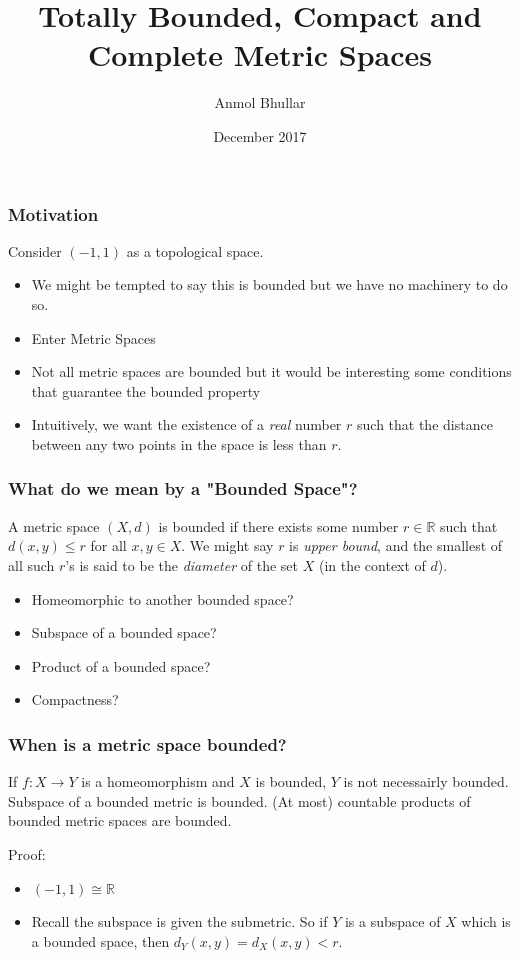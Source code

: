 \documentclass[compress, red]{beamer}
\title{Totally Bounded, Compact and Complete Metric Spaces}
\author{Anmol Bhullar}
\institute{MATC27}
\date{December 2017}
\begin{document}
    \frame{\titlepage}

    \begin{frame}
        \frametitle{Motivation}
        Consider $(-1,1)$ as a topological space.
        \begin{itemize}
            \item<1-> We might be tempted to say this is bounded but we have no machinery to do so.
            \item<2-> Enter Metric Spaces
            \item<3-> Not all metric spaces are bounded but it would be interesting some conditions that guarantee the bounded property
            \item<4-> Intuitively, we want the existence of a \textit{real} number $r$ such that the distance between any two points in 
                the space is less than $r$.
        \end{itemize}
    \end{frame}

    \begin{frame}
        \frametitle{What do we mean by a "Bounded Space"?}
        \begin{definition}
            A metric space $(X,d)$ is \alert{bounded} if there exists some number $r\in\mathbb{R}$ such that $d(x,y)\leq r$ for all $x,y\in X$. We might
            say $r$ is \textit{upper bound}, and the smallest of all such $r$'s is said to be the \textit{diameter} of the set $X$ (in the context 
            of $d$).
        \end{definition}
        \begin{itemize}
            \item<1-> Homeomorphic to another bounded space?
            \item<2-> Subspace of a bounded space?
            \item<3-> Product of a bounded space?
            \item<4-> Compactness?
        \end{itemize}
    \end{frame}

    \begin{frame}
        \frametitle{When is a metric space bounded?}
        \begin{theorem}
            If $f: X \to Y$ is a homeomorphism and $X$ is bounded, $Y$ is not necessairly bounded. Subspace of a bounded metric is bounded.
            (At most) countable products of bounded metric spaces are bounded.
        \end{theorem}
        Proof:
        \begin{itemize}
            \item<1-> $(-1,1)\cong \mathbb{R}$
            \item<2-> Recall the subspace is given the submetric. So if $Y$ is a subspace of $X$ which is a bounded space, then
                $d_Y(x,y) = d_X(x,y) < r$.
        \end{itemize}
    \end{frame}
\end{document}
